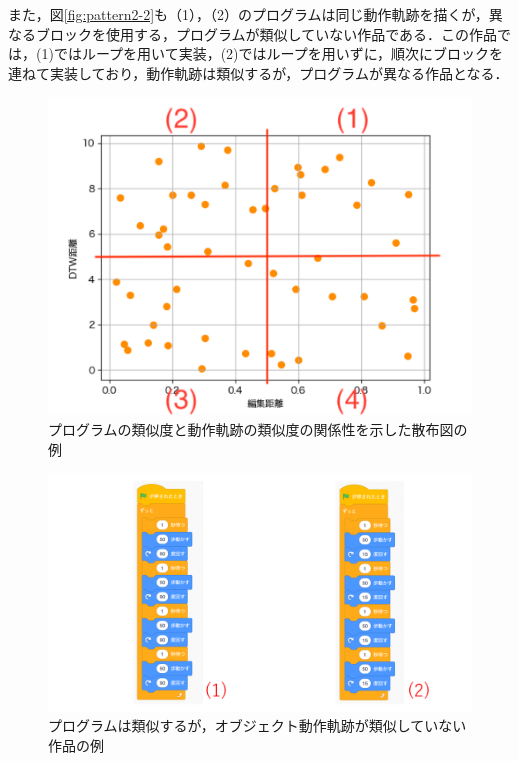 \documentclass[T,J]{fose} %
\begin{document}
また，図\ref{fig:pattern2-2}も（1），（2）のプログラムは同じ動作軌跡を描くが，異なるブロックを使用する，プログラムが類似していない作品である．この作品では，(1)ではループを用いて実装，(2)ではループを用いずに，順次にブロックを連ねて実装しており，動作軌跡は類似するが，プログラムが異なる作品となる．

\begin{figure}[t]
	\centering
	\includegraphics[width=1.0\linewidth]{Okamoto_fig/out-sample.pdf}
	\caption{プログラムの類似度と動作軌跡の類似度の関係性を示した散布図の例}
	\label{fig:sample-scatter}
\end{figure}
\begin{figure}[t]
	\centering
	\includegraphics[width=1.0\linewidth]{Okamoto_fig/pattern1.pdf}
	\caption{プログラムは類似するが，オブジェクト動作軌跡が類似していない作品の例}
	\label{fig:pattern1}
\end{figure}
\end{document}
